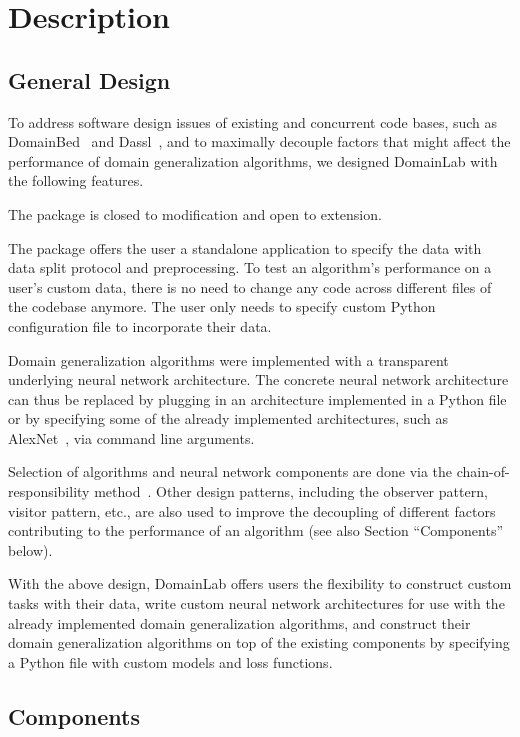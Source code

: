 \section{Description}\label{description}
\subsection{General Design}\label{general-design}

To address software design issues of existing and concurrent code bases,
such as DomainBed~\cite{domainbed2022github, gulrajani2020search} and Dassl~\cite{dassl2022github, zhou2021domain},
and to maximally decouple factors that might affect the performance of
domain generalization algorithms, we designed DomainLab with the
following features.

The package is closed to modification and open to extension.

The package offers the user a standalone application to specify the data
with data split protocol and preprocessing. To test an algorithm's
performance on a user's custom data, there is no need to change any code
across different files of the codebase anymore. The user only needs to
specify custom Python configuration file to incorporate their data.

Domain generalization algorithms were implemented with a transparent
underlying neural network architecture. The concrete neural network
architecture can thus be replaced by plugging in an architecture
implemented in a Python file or by specifying some of the already
implemented architectures, such as AlexNet~\cite{krizhevskyImageNetClassificationDeep2012}, via command line
arguments.

Selection of algorithms and neural network components are done via the
chain-of-responsibility method~\cite{gamma1995design}. Other design
patterns, including the observer pattern, visitor pattern, etc., are
also used to improve the decoupling of different factors contributing to
the performance of an algorithm (see also Section ``Components'' below).

With the above design, DomainLab offers users the flexibility to
construct custom tasks with their data, write custom neural network
architectures for use with the already implemented domain generalization
algorithms, and construct their domain generalization algorithms on top
of the existing components by specifying a Python file with custom
models and loss functions.

\subsection{Components}\label{components}

